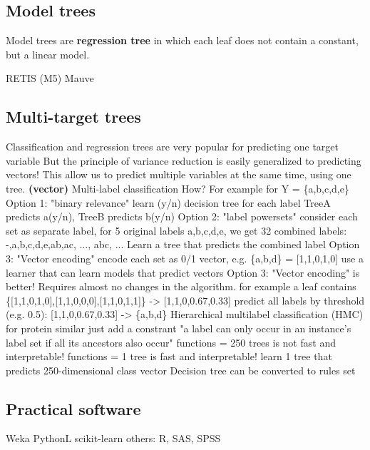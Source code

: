 \subsection{Model trees}
Model trees are \textbf{regression tree} in which each leaf does not contain a constant, but a linear model.
\begin{outline}
    \1 RETIS (M5)
    \1 Mauve
\end{outline}

\subsection{Multi-target trees}
\begin{outline}
    \1 Classification and regression trees are very popular for predicting one target variable
    \1 But the principle of variance reduction is easily generalized to predicting vectors!
    \1 This allow us to predict multiple variables at the same time, using one tree. \textbf{(vector)}
    \1 Multi-label classification
        \2 How? For example for Y = \{a,b,c,d,e\}
        \2 Option 1: "binary relevance"
            \3 learn (y/n) decision tree for each label
            \3 TreeA predicts a(y/n), TreeB predicts b(y/n)
        \2 Option 2: "label powersets" 
            \3 consider each set as separate label, for 5 original labels a,b,c,d,e, we get 32 combined labels: -,a,b,c,d,e,ab,ac, ..., abc, ...
            \3 Learn a tree that predicts the combined label
        \2 Option 3: "Vector encoding"
            \3 encode each set as 0/1 vector, e.g. \{a,b,d\} = [1,1,0,1,0]
            \3 use a learner that can learn models that predict vectors
        \2 Option 3: "Vector encoding" is better! Requires almost no changes in the algorithm.
            \3 for example a leaf contains \{[1,1,0,1,0],[1,1,0,0,0],[1,1,0,1,1]\} -> [1,1,0,0.67,0.33]
            \3 predict all labels by threshold (e.g. 0.5): [1,1,0,0.67,0.33] -> \{a,b,d\}
    \1 Hierarchical multilabel classification (HMC)
        \2 for protein
        \2 similar just add a constrant "a label can only occur in an instance's label set if all its ancestors also occur"
             functions = 250 trees is not fast and interpretable!
             functions = 1 tree is fast and interpretable!
            \3 learn 1 tree that predicts 250-dimensional class vector
        \2 Decision tree can be converted to rules set
\end{outline}

\subsection{Practical software}
\begin{outline}
    \1 Weka
    \1 PythonL scikit-learn
    \1 others: R, SAS, SPSS
\end{outline}
\pagebreak